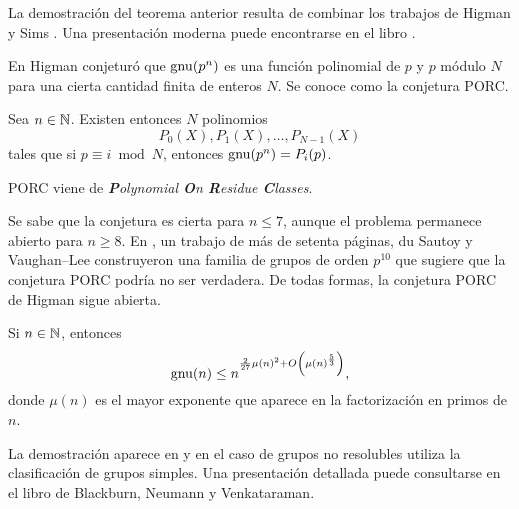 La demostración del teorema anterior resulta de combinar los trabajos de Higman \cite{MR113948} 
y Sims \cite{MR169921}. Una presentación moderna puede encontrarse en el libro
\cite{MR2382539}. 

En \cite{MR123605} Higman conjeturó 
que $\operatorname{gnu}(p^n)$ es una función polinomial de $p$ y $p$ módulo $N$ para una cierta
cantidad finita de enteros $N$. Se conoce como la conjetura PORC.

\begin{conjecture}[Higman]
Sea $n\in\mathbb{N}$. Existen entonces $N$ polinomios 
\[
P_{0}(X),P_{1}(X),\dots,P_{N-1}(X)
\]
tales que
si $p\equiv i\bmod N$, entonces $\operatorname{gnu}(p^n)=P_{i}(p)$. 
\end{conjecture}

PORC viene de \emph{\textbf{P}olynomial \textbf{O}n \textbf{R}esidue \textbf{C}lasses}. 

Se sabe que la conjetura es cierta para $n\leq7$, aunque el problema permanece abierto para $n\geq8$. 
En \cite{MR2921623}, un trabajo de más de setenta páginas, 
du Sautoy y Vaughan--Lee construyeron una familia de grupos
de orden $p^{10}$ que sugiere que la conjetura PORC podría no ser verdadera. De todas formas, la conjetura
PORC de Higman sigue abierta. 

\begin{theorem}[Pyber]
Si $n\in\mathbb{N}$, entonces 
\[
\operatorname{gnu}(n)\leq n^{\frac{2}{27}\mu(n)^2+O\left(\mu(n)^{\frac{5}{3}}\right)},
\]
donde $\mu(n)$ es el mayor exponente
que aparece en la factorización en primos de $n$. 
\end{theorem}

La demostración aparece en \cite{MR1200081} y en el caso de grupos no resolubles utiliza la clasificación de grupos simples. Una presentación detallada puede consultarse en el libro 
\cite{MR2382539} de Blackburn, Neumann y Venkataraman.

